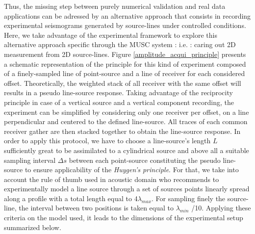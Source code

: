 \documentclass[manuscript,revised]{geophysics}
\begin{document}
\noindent Thus, the missing step between purely numerical validation and real data applications can be adressed by an alternative approach that consists in recording experimental seismograms generated by source-lines under controlled conditions. Here, we take advantage of the experimental framework to explore this alternative approach specific through the MUSC system : i.e. : caring out 2D measurement from 2D source-lines. Figure \ref{amplitude_acqui_principle} presents a schematic representation of the principle for this kind of experiment composed of a finely-sampled line of point-source and a line of receiver for each considered offset. Theoretically, the weighted stack of all receiver with the same offset will results in a pseudo line-source response. Taking advantage of the reciprocity principle in case of a vertical source and a vertical component recording, the experiment can be simplified by considering only one receiver per offset, on a line perpendicular and centered to the defined line-source. All traces of each common receiver gather are then stacked together to obtain the line-source response. In order to apply this protocol, we have to choose a line-source's length $L$ sufficiently great to be assimilated to a cylindrical source and above all a suitable sampling interval $\Delta s$ between each point-source constituting the pseudo line-source to ensure applicability of the \textit{Huygen's principle}. For that, we take into account the rule of thumb used in acoustic domain who recommends to experimentally model a line source through a set of sources points linearly spread along a profile with a total length equal to 4$\lambda_{max}$. For sampling finely the source-line, the interval between two positions is taken equal to  $\lambda_{min}$ /10. Applying these criteria on the model used, it leads to the dimensions of the experimental setup summarized below. 
\end{document}
